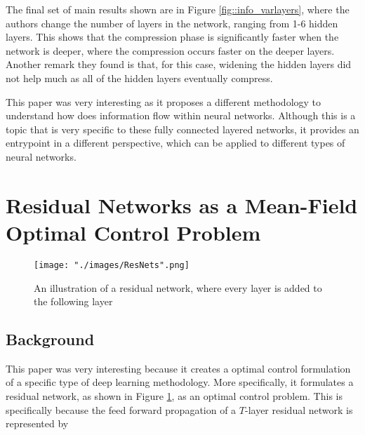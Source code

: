 The final set of main results shown are in Figure \ref{fig::info_varlayers}, where the authors change the number of layers in the network, ranging from 1-6 hidden layers. This shows that the compression phase is significantly faster when the network is deeper, where the compression occurs faster on the deeper layers. Another remark they found is that, for this case, widening the hidden layers did not help much as all of the hidden layers eventually compress.


This paper was very interesting as it proposes a different methodology to understand how does information flow within neural networks. Although this is a topic that is very specific to these fully connected layered networks, it provides an entrypoint in a different perspective, which can be applied to different types of neural networks.

\section{Residual Networks as a Mean-Field Optimal Control Problem \cite{meanfield}}

\begin{figure}[ht]
\begin{center}
    \texttt{[image: "./images/ResNets".png]}
    \caption{An illustration of a residual network, where every layer is added to the following layer}
    \label{fig::resnets}
\end{center}
\end{figure}

\subsection{Background}
This paper was very interesting because it creates a optimal control formulation of a specific type of deep learning methodology. More specifically, it formulates a residual network, as shown in Figure \ref{fig::resnets}, as an optimal control problem. This is specifically because the feed forward propagation of a $T$-layer residual network is represented by

